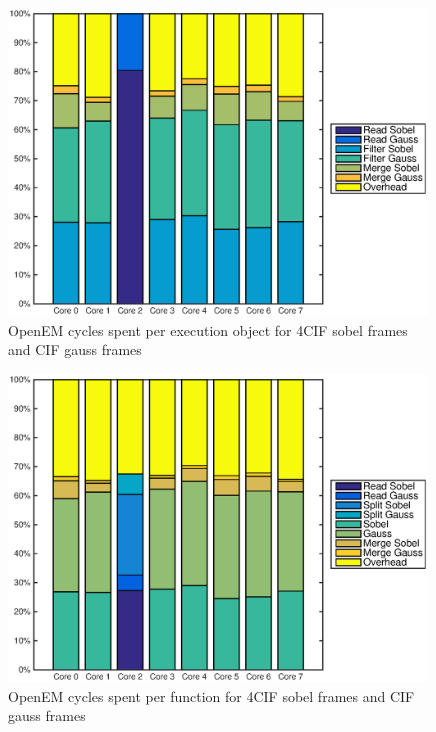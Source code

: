 \begin{figure}[h!]
    \begin{center}
        \includegraphics[width=0.99\textwidth]{images/openem_sobel4cif_gausscif_eo.eps}
        \caption{OpenEM cycles spent per execution object for 4CIF sobel frames and CIF gauss frames}
    \end{center}
\end{figure}

\begin{figure}[h!]
    \begin{center}
        \includegraphics[width=0.99\textwidth]{images/openem_sobel4cif_gausscif_func.eps}
        \caption{OpenEM cycles spent per function for 4CIF sobel frames and CIF gauss frames}
        \label{fig:oem8corefuncsobel4cif}
    \end{center}
\end{figure}

